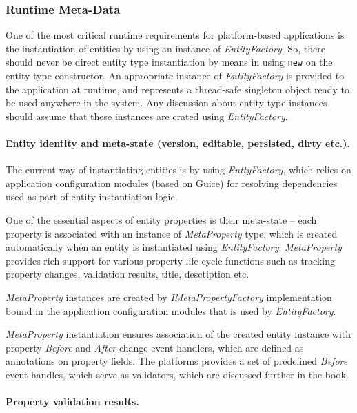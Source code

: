 \subsubsection{Runtime Meta-Data}
  One of the most critical runtime requirements for platform-based applications is the instantiation of entities by using an instance of \emph{EntityFactory}.
  So, there should never be direct entity type instantiation by means in using \texttt{new} on the entity type constructor.
  An appropriate instance of \emph{EntityFactory} is provided to the application at runtime, and represents a thread-safe singleton object ready to be used anywhere in the system.
  Any discussion about entity type instances should assume that these instances are crated using \emph{EntityFactory}.

  \paragraph*{Entity identity and meta-state (version, editable, persisted, dirty etc.).}

  The current way of instantiating entities is by using \emph{EnttyFactory}, which relies on application configuration modules (based on Guice) for resolving dependencies used as part of entity instantiation logic.

  One of the essential aspects of entity properties is their meta-state -- each property is associated with an instance of \emph{MetaProperty} type, which is created automatically when an entity is instantiated using \emph{EntityFactory}. 
  \emph{MetaProperty} provides rich support for various property life cycle functions such as tracking property changes, validation results, title, desctiption etc.

  \emph{MetaProperty} instances are created by \emph{IMetaPropertyFactory} implementation bound in the application configuration modules that is used by \emph{EntityFactory}.

  \emph{MetaProperty} instantiation ensures association of the created entity instance with property \emph{Before} and \emph{After} change event handlers, which are defined as annotations on property fields. 
  The platforms provides a set of predefined \emph{Before} event handles, which serve as validators, which are discussed further in the book. 
  

  \paragraph*{Property validation results.}
